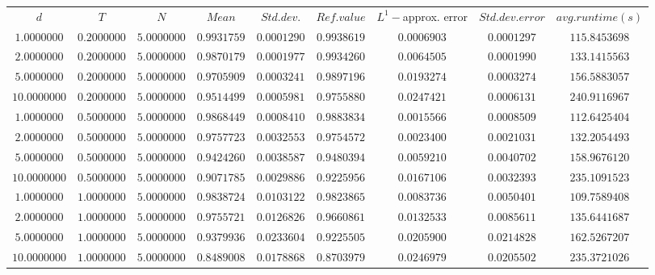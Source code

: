 \begin{tabular}{ccccccccc}
$d$ & $T$ & $N$ & $Mean$ & $Std. dev.$ & $Ref. value$ & $L^1-$approx. error & $Std. dev. error$ & $avg. runtime (s)$\\
$1.0000000$ & $0.2000000$ & $5.0000000$ & $0.9931759$ & $0.0001290$ & $0.9938619$ & $0.0006903$ & $0.0001297$ & $115.8453698$\\
$2.0000000$ & $0.2000000$ & $5.0000000$ & $0.9870179$ & $0.0001977$ & $0.9934260$ & $0.0064505$ & $0.0001990$ & $133.1415563$\\
$5.0000000$ & $0.2000000$ & $5.0000000$ & $0.9705909$ & $0.0003241$ & $0.9897196$ & $0.0193274$ & $0.0003274$ & $156.5883057$\\
$10.0000000$ & $0.2000000$ & $5.0000000$ & $0.9514499$ & $0.0005981$ & $0.9755880$ & $0.0247421$ & $0.0006131$ & $240.9116967$\\
$1.0000000$ & $0.5000000$ & $5.0000000$ & $0.9868449$ & $0.0008410$ & $0.9883834$ & $0.0015566$ & $0.0008509$ & $112.6425404$\\
$2.0000000$ & $0.5000000$ & $5.0000000$ & $0.9757723$ & $0.0032553$ & $0.9754572$ & $0.0023400$ & $0.0021031$ & $132.2054493$\\
$5.0000000$ & $0.5000000$ & $5.0000000$ & $0.9424260$ & $0.0038587$ & $0.9480394$ & $0.0059210$ & $0.0040702$ & $158.9676120$\\
$10.0000000$ & $0.5000000$ & $5.0000000$ & $0.9071785$ & $0.0029886$ & $0.9225956$ & $0.0167106$ & $0.0032393$ & $235.1091523$\\
$1.0000000$ & $1.0000000$ & $5.0000000$ & $0.9838724$ & $0.0103122$ & $0.9823865$ & $0.0083736$ & $0.0050401$ & $109.7589408$\\
$2.0000000$ & $1.0000000$ & $5.0000000$ & $0.9755721$ & $0.0126826$ & $0.9660861$ & $0.0132533$ & $0.0085611$ & $135.6441687$\\
$5.0000000$ & $1.0000000$ & $5.0000000$ & $0.9379936$ & $0.0233604$ & $0.9225505$ & $0.0205900$ & $0.0214828$ & $162.5267207$\\
$10.0000000$ & $1.0000000$ & $5.0000000$ & $0.8489008$ & $0.0178868$ & $0.8703979$ & $0.0246979$ & $0.0205502$ & $235.3721026$\\
\end{tabular}

